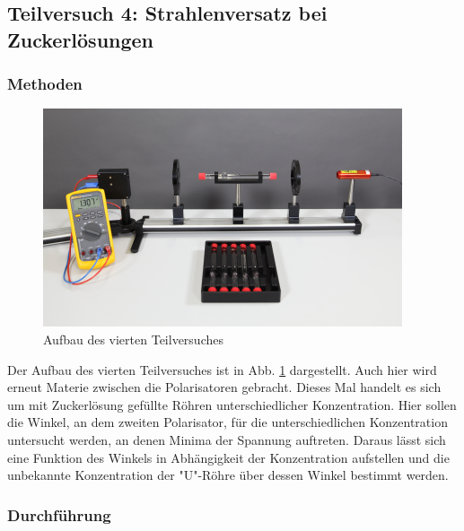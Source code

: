 \subsection{Teilversuch 4: Strahlenversatz bei Zuckerlösungen}

	\subsubsection*{Methoden}
		
		\begin{figure}[ht]
			\centering
			\includegraphics[width=\textwidth]{bilder/Zucker.png}
			\caption{Aufbau des vierten Teilversuches\cite{WWU}}
			\label{fig:Zucker}	
		\end{figure}
		Der Aufbau des vierten Teilversuches ist in Abb. \ref{fig:Zucker} dargestellt.
		Auch hier wird erneut Materie zwischen die Polarisatoren gebracht.
		Dieses Mal handelt es sich um mit Zuckerlösung gefüllte Röhren unterschiedlicher Konzentration.
		Hier sollen die Winkel, an dem zweiten Polarisator, für die unterschiedlichen Konzentration untersucht werden, an denen Minima der Spannung auftreten.
		Daraus lässt sich eine Funktion des Winkels in Abhängigkeit der Konzentration aufstellen und die unbekannte Konzentration der "U"-Röhre über dessen Winkel bestimmt werden.
		
	\subsubsection*{Durchführung}
		
